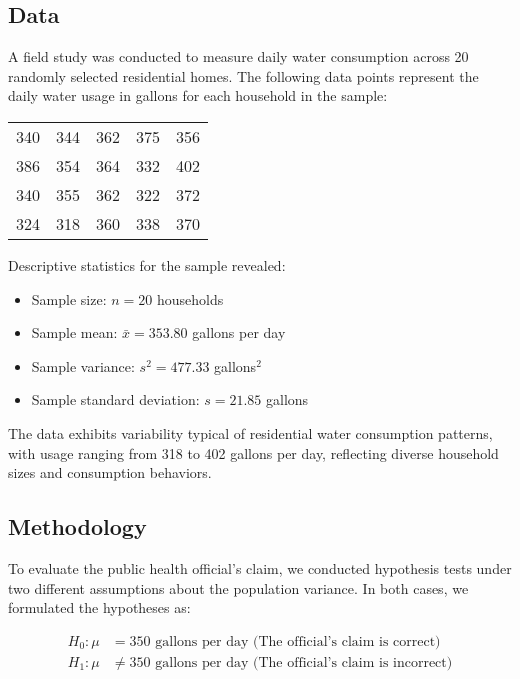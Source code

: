 \documentclass[12pt]{article}
\begin{document}
\subsection{Data}
A field study was conducted to measure daily water consumption across 20 randomly selected residential homes. The following data points represent the daily water usage in gallons for each household in the sample:

\begin{center}
\begin{tabular}{ccccc}
340 & 344 & 362 & 375 & 356 \\
386 & 354 & 364 & 332 & 402 \\
340 & 355 & 362 & 322 & 372 \\
324 & 318 & 360 & 338 & 370 \\
\end{tabular}
\end{center}

\noindent Descriptive statistics for the sample revealed:

\begin{itemize}
    \item Sample size: $n = 20$ households
    \item Sample mean: $\bar{x} = 353.80$ gallons per day
    \item Sample variance: $s^2 = 477.33$ gallons$^2$
    \item Sample standard deviation: $s = 21.85$ gallons
\end{itemize}

\noindent The data exhibits variability typical of residential water consumption patterns, with usage ranging from 318 to 402 gallons per day, reflecting diverse household sizes and consumption behaviors.

\subsection{Methodology}
To evaluate the public health official's claim, we conducted hypothesis tests under two different assumptions about the population variance. In both cases, we formulated the hypotheses as:

\begin{align}
H_0: \mu &= 350 \text{ gallons per day (The official's claim is correct)} \\
H_1: \mu &\neq 350 \text{ gallons per day (The official's claim is incorrect)}
\end{align}
\end{document}

